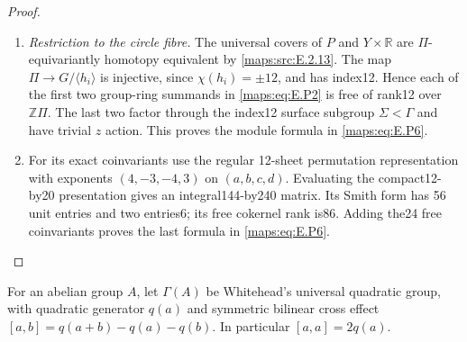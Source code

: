 \begin{proof}
\begin{enumerate}[label={$\langle1\rangle$\arabic*.},leftmargin=*]
\item \emph{Restriction to the circle fibre.}
The universal covers of $P$ and $Y\times\mathbb R$
are $\Pi$-equivariantly homotopy equivalent by
\ref{maps:src:E.2.13}. The map $\Pi\to G/\langle h_i\rangle$
is injective, since $\chi(h_i)=\pm12$, and has
index12. Hence each of the first two group-ring
summands in \eqref{maps:eq:E.P2} is free of rank12 over
$\mathbb Z\Pi$. The last two factor through the
index12 surface subgroup $\Sigma<\Gamma$ and
have trivial $z$ action. This proves the module
formula in \eqref{maps:eq:E.P6}.

\item For its exact coinvariants use the regular
12-sheet permutation representation with
exponents $(4,-3,-4,3)$ on $(a,b,c,d)$.
Evaluating the compact12-by20 presentation gives
an integral144-by240 matrix. Its Smith form has
56 unit entries and two entries6; its free
cokernel rank is86. Adding the24 free
coinvariants proves the last formula in \eqref{maps:eq:E.P6}.

\end{enumerate}
\end{proof}


\begin{definition}\label{def:V:whitehead-quadratic}
For an abelian group $A$, let $\Gamma(A)$ be Whitehead's universal
quadratic group, with quadratic generator $q(a)$ and symmetric
bilinear cross effect
$[a,b]=q(a+b)-q(a)-q(b)$.  In particular $[a,a]=2q(a)$.
\end{definition}

